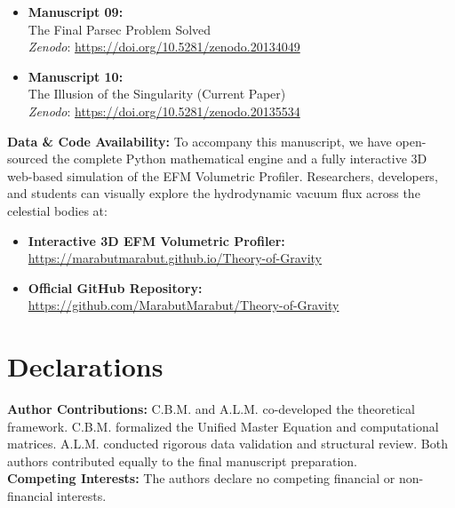 \documentclass[11pt, a4paper]{article}
\begin{document}
\begin{itemize}
    \item \textbf{Manuscript 09:} \\ The Final Parsec Problem Solved \\ \textit{Zenodo}: \url{https://doi.org/10.5281/zenodo.20134049}

    \item \textbf{Manuscript 10:} \\ The Illusion of the Singularity (Current Paper) \\ \textit{Zenodo}: \url{https://doi.org/10.5281/zenodo.20135534}
  \end{itemize}

  \clearpage
  \vspace{1em}
  \noindent \textbf{Data \& Code Availability:} To accompany this manuscript, we have open-sourced the complete Python mathematical engine and a fully interactive 3D web-based simulation of the EFM Volumetric Profiler. Researchers, developers, and students can visually explore the hydrodynamic vacuum flux across the celestial bodies at: 
  \begin{itemize}
    \item \textbf{Interactive 3D EFM Volumetric Profiler:} \\ \url{https://marabutmarabut.github.io/Theory-of-Gravity}
    
    \item \textbf{Official GitHub Repository:} \\ \url{https://github.com/MarabutMarabut/Theory-of-Gravity}
  \end{itemize}

\clearpage
\section*{Declarations}
\textbf{Author Contributions:} C.B.M. and A.L.M. co-developed the theoretical framework. C.B.M. formalized the Unified Master Equation and computational matrices. A.L.M. conducted rigorous data validation and structural review. Both authors contributed equally to the final manuscript preparation. \\[0.5em]
\textbf{Competing Interests:} The authors declare no competing financial or non-financial interests.

\end{document}
